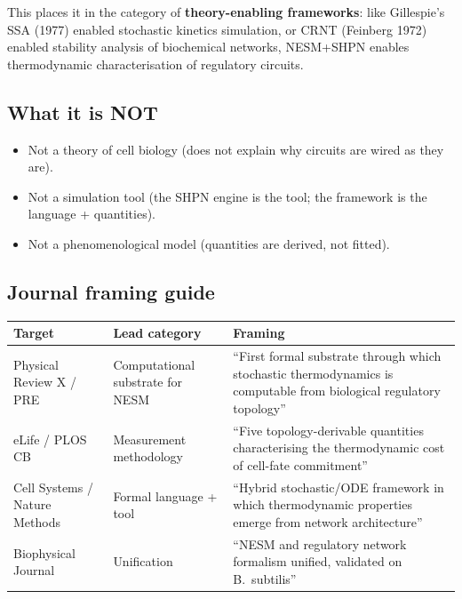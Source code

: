 \documentclass[11pt,a4paper]{article}
\begin{document}
This places it in the category of \textbf{theory-enabling frameworks}:
like Gillespie's SSA (1977) enabled stochastic kinetics simulation, or
CRNT (Feinberg 1972) enabled stability analysis of biochemical networks,
NESM+SHPN enables thermodynamic characterisation of regulatory circuits.

\subsection*{What it is NOT}

\begin{itemize}
  \item Not a theory of cell biology (does not explain why circuits are
    wired as they are).
  \item Not a simulation tool (the SHPN engine is the tool; the framework
    is the language + quantities).
  \item Not a phenomenological model (quantities are derived, not fitted).
\end{itemize}

\subsection*{Journal framing guide}

\begin{center}
\begin{tabular}{p{3.5cm}p{3.5cm}p{5.5cm}}
\toprule
Target & Lead category & Framing \\
\midrule
Physical Review X / PRE & Computational substrate for NESM &
  ``First formal substrate through which stochastic thermodynamics is
  computable from biological regulatory topology'' \\
eLife / PLOS CB & Measurement methodology &
  ``Five topology-derivable quantities characterising the thermodynamic
  cost of cell-fate commitment'' \\
Cell Systems / Nature Methods & Formal language + tool &
  ``Hybrid stochastic/ODE framework in which thermodynamic properties
  emerge from network architecture'' \\
Biophysical Journal & Unification &
  ``NESM and regulatory network formalism unified, validated on
  B.\ subtilis'' \\
\bottomrule
\end{tabular}
\end{center}

\end{document}
